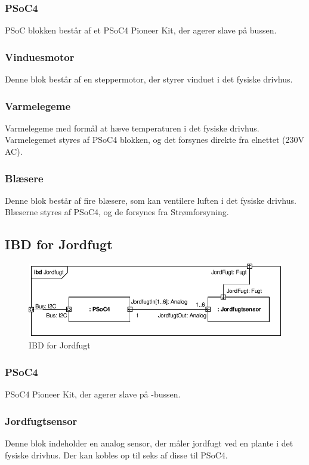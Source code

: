 \subsubsection{PSoC4}
PSoC blokken består af et PSoC4 Pioneer Kit, der agerer slave på \IIC bussen. 
\subsubsection{Vinduesmotor}
Denne blok består af en steppermotor, der styrer vinduet i det fysiske drivhus.
\subsubsection{Varmelegeme}
Varmelegeme med formål at hæve temperaturen i det fysiske drivhus. Varmelegemet styres af PSoC4 blokken, og det forsynes direkte fra elnettet (230V AC). 
\subsubsection{Blæsere}
Denne blok består af fire blæsere, som kan ventilere luften i det fysiske drivhus. Blæserne styres af PSoC4, og de forsynes fra Strømforsyning. 

\clearpage

\subsection{IBD for Jordfugt}

\begin{figure}[h]
\centering 
\includegraphics[width={\textwidth}] {../fig/ibd_jordfugt.pdf}
\caption{IBD for Jordfugt}
\label{fig:ibd_jordfugt}
\end{figure}

\subsubsection{PSoC4}
PSoC4 Pioneer Kit, der agerer slave på \IIC-bussen. 
\subsubsection{Jordfugtsensor}
Denne blok indeholder en analog sensor, der måler jordfugt ved en plante i det fysiske drivhus. Der kan kobles op til seks af disse til PSoC4.

